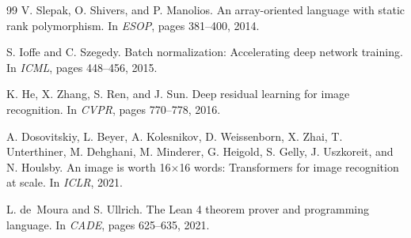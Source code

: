 \documentclass[11pt]{article}
\begin{document}
\begin{thebibliography}{99}
V. Slepak, O. Shivers, and P. Manolios.
\newblock An array-oriented language with static rank polymorphism.
\newblock In \textit{ESOP}, pages 381--400, 2014.

S. Ioffe and C. Szegedy.
\newblock Batch normalization: Accelerating deep network training.
\newblock In \textit{ICML}, pages 448--456, 2015.

K. He, X. Zhang, S. Ren, and J. Sun.
\newblock Deep residual learning for image recognition.
\newblock In \textit{CVPR}, pages 770--778, 2016.

A. Dosovitskiy, L. Beyer, A. Kolesnikov, D. Weissenborn, X. Zhai,
T. Unterthiner, M. Dehghani, M. Minderer, G. Heigold, S. Gelly,
J. Uszkoreit, and N. Houlsby.
\newblock An image is worth 16$\times$16 words: Transformers for image
recognition at scale.
\newblock In \textit{ICLR}, 2021.

L. de~Moura and S. Ullrich.
\newblock The {Lean} 4 theorem prover and programming language.
\newblock In \textit{CADE}, pages 625--635, 2021.

\end{thebibliography}
\end{document}
